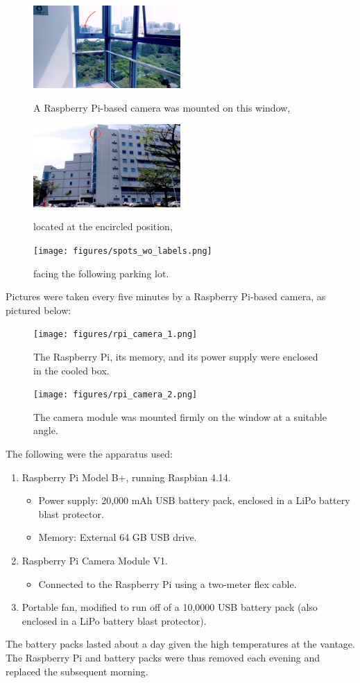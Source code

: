 \documentclass[a4paper, 11pt]{article} %
\begin{document}
		\begin{figure}[H]
			\centering
			\includegraphics[width=0.5\textwidth]{figures/context_1.jpg}
			\caption{A Raspberry Pi-based camera was mounted on this window,}
			\vskip 5mm
			\includegraphics[width=0.5\textwidth]{figures/context_2.jpg}
			\caption{located at the encircled position,}
			\vskip 5mm
			\texttt{[image: figures/spots\_wo\_labels.png]}
			\caption{facing the following parking lot.}
		\end{figure}
		\vskip -5mm
		\hspace*{-6mm}Pictures were taken every five minutes by a Raspberry 
		Pi-based camera, as pictured below:
		\vskip 5mm
		\begin{figure}[H]
			\centering
			\texttt{[image: figures/rpi\_camera\_1.png]}
			\caption{The Raspberry Pi, its memory, and its power supply were 
			enclosed in the cooled box.}
			\vskip 5mm
			\texttt{[image: figures/rpi\_camera\_2.png]}
			\caption{The camera module was mounted firmly on the window at a 
			suitable angle.}
		\end{figure}
		\hspace*{-6mm}The following were the apparatus used:
		\begin{enumerate}
			\item Raspberry Pi Model B+, running Raspbian 4.14.
			\vskip -5mm
			\begin{itemize}
				\item[] Power supply: 20,000 mAh USB battery pack, enclosed in 
				a LiPo battery blast protector.
				\item[] Memory: External 64 GB USB drive.
			\end{itemize}
			\item Raspberry Pi Camera Module V1.
			\begin{itemize}
				\item[] Connected to the Raspberry Pi using a two-meter flex cable.
			\end{itemize}
			\item Portable fan, modified to run off of a 10,0000 USB battery 
			pack (also enclosed in a LiPo battery blast protector).
		\end{enumerate}
		The battery packs lasted about a day given the high temperatures at the 
		vantage. The Raspberry Pi and battery packs were thus removed each 
		evening and replaced the subsequent morning.
\end{document}
